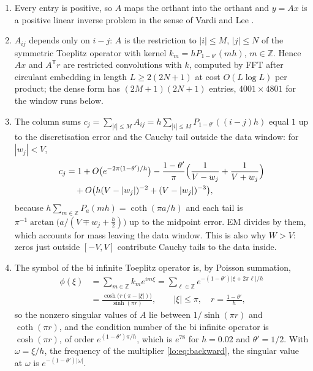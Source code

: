 \begin{enumerate}
\item[(a)] Every entry is positive, so $A$ maps the orthant into the orthant and $y=Ax$ is a positive linear inverse problem in the sense of Vardi and Lee \cite{VardiLee93}.
\item[(b)] $A_{ij}$ depends only on $i-j$: $A$ is the restriction to $|i|\le M$, $|j|\le N$ of the symmetric Toeplitz operator with kernel $k_m=hP_{1-\theta'}(mh)$, $m\in\mathbb Z$. Hence $Ax$ and $A^{\mathsf T}r$ are restricted convolutions with $k$, computed by FFT after circulant embedding in length $L\ge2(2N+1)$ at cost $O(L\log L)$ per product; the dense form has $(2M+1)(2N+1)$ entries, $4001\times4801$ for the window runs below.
\item[(c)] The column sums $c_j=\sum_{|i|\le M}A_{ij}=h\sum_{|i|\le M}P_{1-\theta'}((i-j)h)$ equal $1$ up to the discretisation error and the Cauchy tail outside the data window: for $|w_j|<V$,
\[
\begin{split}c_j&=1+O\bigl(e^{-2\pi(1-\theta')/h}\bigr)-\frac{1-\theta'}{\pi}\Bigl(\frac1{V-w_j}+\frac1{V+w_j}\Bigr)\\&\quad+O\bigl(h(V-|w_j|)^{-2}+(V-|w_j|)^{-3}\bigr),\end{split}
\]
because $h\sum_{m\in\mathbb Z}P_a(mh)=\coth(\pi a/h)$ and each tail is $\pi^{-1}\arctan\bigl(a/(V\mp w_j+\tfrac h2)\bigr)$ up to the midpoint error. EM divides by them, which accounts for mass leaving the data window. This is also why $W>V$: zeros just outside $[-V,V]$ contribute Cauchy tails to the data inside.
\item[(d)] The symbol of the bi infinite Toeplitz operator is, by Poisson summation,
\[
\begin{split}\phi(\xi)&=\sum_{m\in\mathbb Z}k_me^{im\xi}=\sum_{\ell\in\mathbb Z}e^{-(1-\theta')|\xi+2\pi\ell|/h}\\&=\frac{\cosh\bigl(r(\pi-|\xi|)\bigr)}{\sinh(\pi r)},\qquad|\xi|\le\pi,\quad r=\frac{1-\theta'}h,\end{split}
\]
so the nonzero singular values of $A$ lie between $1/\sinh(\pi r)$ and $\coth(\pi r)$, and the condition number of the bi infinite operator is $\cosh(\pi r)$, of order $e^{(1-\theta')\pi/h}$, which is $e^{78}$ for $h=0.02$ and $\theta'=1/2$. With $\omega=\xi/h$, the frequency of the multiplier \eqref{lo:eq:backward}, the singular value at $\omega$ is $e^{-(1-\theta')|\omega|}$.

\end{enumerate}
